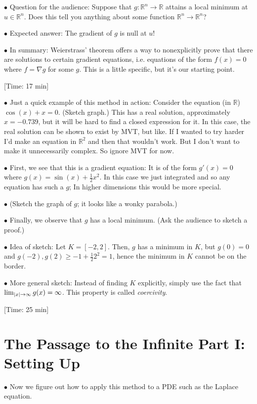 \documentclass{article}
\newcommand{\R}{\mathbb{R}}
\DeclarePairedDelimiter{\abs}{\lvert}{\rvert}
\newcommand\point[1]{\noindent \hspace{\labelsep} $\bullet$ #1 \smallskip}
\newcommand\timestamp[1]{\noindent \hspace{\labelsep} [Time: #1] \smallskip}
\begin{document}
\point{Question for the audience: Suppose that $g \colon \R^n \to \R$ attains a local minimum at $u \in \R^n$. Does this tell you anything about some function $\R^n \to \R^n$?}

\point{Expected answer: The gradient of $g$ is null at $u$!}

\point{In summary: Weierstrass' theorem offers a way to nonexplicitly prove that there are solutions to certain gradient equations, i.e. equations of the form $f(x) = 0$ where $f = \nabla g$ for some $g$. This is a little specific, but it's our starting point.}

\timestamp{17 min}

\point{Just a quick example of this method in action: Consider the equation (in $\R$) $\cos(x) + x = 0$. (Sketch graph.) This has a real solution, approximately $x = -0.739$, but it will be hard to find a closed expression for it. In this case, the real solution can be shown to exist by MVT, but like. If I wanted to try harder I'd make an equation in $\R^2$ and then that wouldn't work. But I don't want to make it unnecessarily complex. So ignore MVT for now.}

\point{First, we see that this is a gradient equation: It is of the form $g'(x) = 0$ where $g(x) = \sin(x) + \frac12 x^2$. In this case we just integrated and so any equation has such a $g$; In higher dimensions this would be more special.}

\point{(Sketch the graph of $g$; it looks like a wonky parabola.)}

\point{Finally, we observe that $g$ has a local minimum. (Ask the audience to sketch a proof.)}

\point{Idea of sketch: Let $K = [-2, 2]$. Then, $g$ has a minimum in $K$, but $g(0) = 0$ and $g(-2), g(2) \geq -1 + \frac12 2^2 = 1$, hence the minimum in $K$ cannot be on the border.}

\point{More general sketch: Instead of finding $K$ explicitly, simply use the fact that $\lim_{\abs x \to \infty} g(x) = \infty$. This property is called \emph{coercivity}.}

\timestamp{25 min}

\section{The Passage to the Infinite Part I: Setting Up}

\point{Now we figure out how to apply this method to a PDE such as the Laplace equation.}
\end{document}
